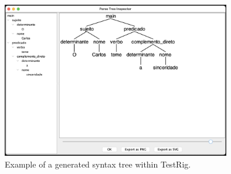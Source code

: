 \begin{figure}[h]
    \centering
    \includegraphics[width=10cm]{images/testrig_gui_example.png}
    \caption{Example of a generated syntax tree within TestRig.}
    \label{fig:system_architecture}
\end{figure}



